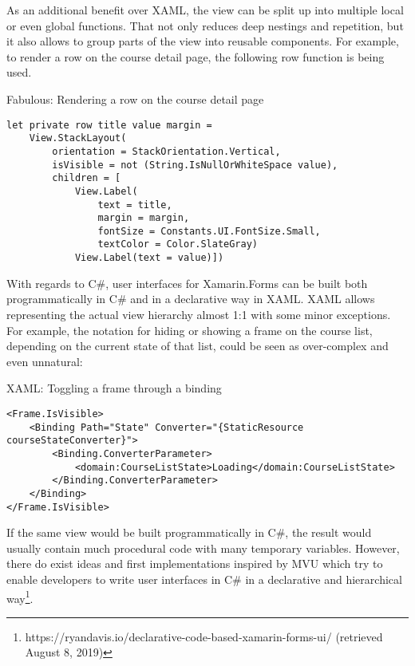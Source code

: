 As an additional benefit over XAML, the view can be split up into multiple local or even global functions. That not only reduces deep nestings and repetition, but it also allows to group parts of the view into reusable components. For example, to render a row on the course detail page, the following row function is being used.

\begin{listing}[H]
\caption{Fabulous: Rendering a row on the course detail page}
\begin{verbatim}
let private row title value margin =
    View.StackLayout(
        orientation = StackOrientation.Vertical,
        isVisible = not (String.IsNullOrWhiteSpace value),
        children = [
            View.Label(
                text = title,
                margin = margin,
                fontSize = Constants.UI.FontSize.Small,
                textColor = Color.SlateGray)
            View.Label(text = value)])
\end{verbatim}
\end{listing}

With regards to C\#, user interfaces for Xamarin.Forms can be built both programmatically in C\# and in a declarative way in XAML. XAML allows representing the actual view hierarchy almost 1:1 with some minor exceptions. For example, the notation for hiding or showing a frame on the course list, depending on the current state of that list, could be seen as over-complex and even unnatural:

\begin{listing}[H]
\caption{XAML: Toggling a frame through a binding}
\begin{verbatim}
<Frame.IsVisible>
    <Binding Path="State" Converter="{StaticResource courseStateConverter}">
        <Binding.ConverterParameter>
            <domain:CourseListState>Loading</domain:CourseListState>
        </Binding.ConverterParameter>
    </Binding>
</Frame.IsVisible>
\end{verbatim}
\end{listing}

If the same view would be built programmatically in C\#, the result would usually contain much procedural code with many temporary variables. However, there do exist ideas and first implementations inspired by MVU which try to enable developers to write user interfaces in C\# in a declarative and hierarchical way\footnote{https://ryandavis.io/declarative-code-based-xamarin-forms-ui/ (retrieved August 8, 2019)}.
